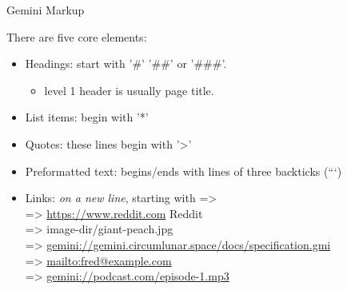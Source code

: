 \documentclass[presentation, 11pt,  aspectratio=169]{beamer}
\begin{document}
\begin{frame}[label={sec:org451e5b9}]{Gemini Markup}
\begin{block}{There are five core elements:}
\begin{itemize}
\item \alert{Headings:} start with '\#' '\#\#' or '\#\#\#'.\\
\begin{itemize}
\item level 1 header is usually page title.\\
\end{itemize}
\item \alert{List items:} begin with '*'\\
\item \alert{Quotes:} these lines begin with '>'\\
\item \alert{Preformatted text:} begins/ends with lines of three backticks (```)\\
\end{itemize}
\pause
\begin{itemize}
\item \alert{Links:} \emph{on a new line}, starting with \alert{=>}\\
=> \url{https://www.reddit.com} Reddit\\
=> image-dir/giant-peach.jpg\\
=> \href{gemini://gemini.circumlunar.space/docs/specification.gmi}{gemini://gemini.circumlunar.space/docs/specification.gmi}\\
=> \url{mailto:fred@example.com}\\
=> \href{gemini://podcast.com/episode-1.mp3}{gemini://podcast.com/episode-1.mp3}\\
\end{itemize}
\end{block}
\end{frame}
\end{document}
